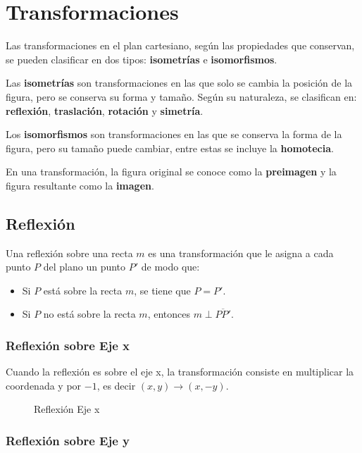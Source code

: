 \clearpage
\section{Transformaciones}

Las transformaciones en el plan cartesiano, según las propiedades que conservan, se pueden clasificar en dos tipos: \textbf{isometrías} e \textbf{isomorfismos}.

Las \textbf{isometrías} son transformaciones en las que solo se cambia la posición de la figura, pero se conserva su forma y tamaño. Según su naturaleza, se clasifican en: \textbf{reflexión}, \textbf{traslación}, \textbf{rotación} y \textbf{simetría}.

Los \textbf{isomorfismos} son transformaciones en las que se conserva la forma de la figura, pero su tamaño puede cambiar, entre estas se incluye la \textbf{homotecia}.

En una transformación, la figura original se conoce como la \textbf{preimagen} y la figura resultante como la \textbf{imagen}.


\subsection{Reflexión}

Una reflexión sobre una recta $m$ es una transformación que le asigna a cada punto $P$ del plano un punto $P'$ de modo que:

\begin{itemize}
    \item Si $P$ está sobre la recta $m$, se tiene que $P = P'$.
    \item Si $P$ no está sobre la recta $m$, entonces $m \perp \overline{PP'}$.
\end{itemize}

\subsubsection{Reflexión sobre Eje x}

Cuando la reflexión es sobre el eje x, la transformación consiste en multiplicar la coordenada y por $-1$, es decir $(x,y) \to (x,-y)$.

\begin{figure}[h]
    \centering
    
    \caption{Reflexión Eje x}
    \label{fig:reflexion-eje-x}
\end{figure}


\subsubsection{Reflexión sobre Eje y}

